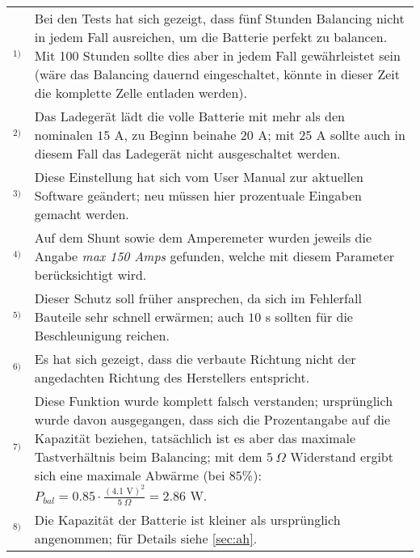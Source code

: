 \color{blue}
\begin{tabular}{p{1cm}p{15cm}}
$^{1)}$ & Bei den Tests hat sich gezeigt, dass fünf Stunden Balancing nicht in jedem Fall ausreichen, um die Batterie perfekt zu balancen. Mit 100 Stunden sollte dies aber in jedem Fall gewährleistet sein (wäre das Balancing dauernd eingeschaltet, könnte in dieser Zeit die komplette Zelle entladen werden).\\[6pt]

$^{2)}$ & Das Ladegerät lädt die volle Batterie mit mehr als den nominalen $15$ A, zu Beginn beinahe $20$ A; mit $25$ A sollte auch in diesem Fall das Ladegerät nicht ausgeschaltet werden.\\[6pt]

$^{3)}$ & Diese Einstellung hat sich vom User Manual zur aktuellen Software geändert; neu müssen hier prozentuale Eingaben gemacht werden.\\[6pt]

$^{4)}$ & Auf dem Shunt sowie dem Amperemeter wurden jeweils die Angabe \textit{max 150 Amps} gefunden, welche mit diesem Parameter berücksichtigt wird.\\[6pt]

$^{5)}$ & Dieser Schutz soll früher ansprechen, da sich im Fehlerfall Bauteile sehr schnell erwärmen; auch $10$ s sollten für die Beschleunigung reichen.\\[6pt]

$^{6)}$ & Es hat sich gezeigt, dass die verbaute Richtung nicht der angedachten Richtung des Herstellers entspricht.\\[6pt]

$^{7)}$ & Diese Funktion wurde komplett falsch verstanden; ursprünglich wurde davon ausgegangen, dass sich die Prozentangabe auf die Kapazität beziehen, tatsächlich ist es aber das maximale Tastverhältnis beim Balancing; mit dem $5\ \Omega$ Widerstand ergibt sich eine maximale Abwärme (bei 85\%): $P_{bal}=0.85\cdot\frac{\left(4.1\text{ V}\right)^2}{5\ \Omega}=2.86$ W.\\[6pt]

$^{8)}$ & Die Kapazität der Batterie ist kleiner als ursprünglich angenommen; für Details siehe \ref{sec:ah}.
\end{tabular}
\color{black}